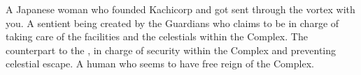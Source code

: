 \documentclass[char]{guardians}
\begin{document}
\begin{contacts}
  \contact{\cKachiko{}} A Japanese woman who founded Kachicorp and got sent through the vortex with you.
   A sentient being created by the Guardians who claims to be in charge of taking care of the facilities and the celestials within the Complex.
   The counterpart to the \cCaretaker{}, in charge of security within the Complex and preventing celestial escape.
  \contact{\cJascha{\intro}} A human who seems to have free reign of the Complex.
\end{contacts}
\end{document}
